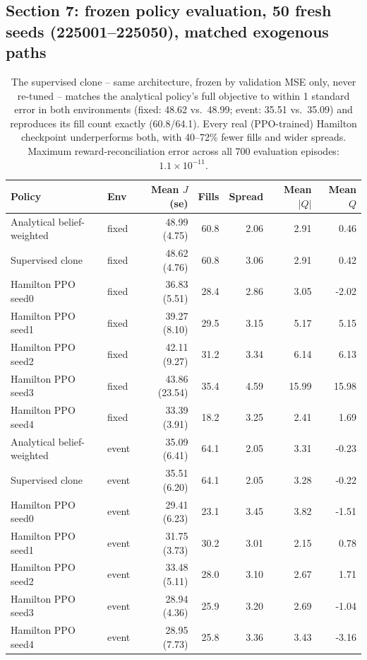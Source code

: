 \subsection*{Section 7: frozen policy evaluation, 50 fresh seeds (225001--225050), matched exogenous paths}
\begin{table}[h]
\centering
\small
\begin{tabular}{llrrrrr}
\hline
Policy & Env & Mean $J$ (se) & Fills & Spread & Mean $|Q|$ & Mean $Q$ \\
\hline
Analytical belief-weighted & fixed & 48.99 (4.75) & 60.8 & 2.06 & 2.91 &  0.46 \\
Supervised clone           & fixed & 48.62 (4.76) & 60.8 & 3.06 & 2.91 &  0.42 \\
Hamilton PPO seed0         & fixed & 36.83 (5.51) & 28.4 & 2.86 & 3.05 & -2.02 \\
Hamilton PPO seed1         & fixed & 39.27 (8.10) & 29.5 & 3.15 & 5.17 &  5.15 \\
Hamilton PPO seed2         & fixed & 42.11 (9.27) & 31.2 & 3.34 & 6.14 &  6.13 \\
Hamilton PPO seed3         & fixed & 43.86 (23.54)& 35.4 & 4.59 &15.99 & 15.98 \\
Hamilton PPO seed4         & fixed & 33.39 (3.91) & 18.2 & 3.25 & 2.41 &  1.69 \\
\hline
Analytical belief-weighted & event & 35.09 (6.41) & 64.1 & 2.05 & 3.31 & -0.23 \\
Supervised clone           & event & 35.51 (6.20) & 64.1 & 2.05 & 3.28 & -0.22 \\
Hamilton PPO seed0         & event & 29.41 (6.23) & 23.1 & 3.45 & 3.82 & -1.51 \\
Hamilton PPO seed1         & event & 31.75 (3.73) & 30.2 & 3.01 & 2.15 &  0.78 \\
Hamilton PPO seed2         & event & 33.48 (5.11) & 28.0 & 3.10 & 2.67 &  1.71 \\
Hamilton PPO seed3         & event & 28.94 (4.36) & 25.9 & 3.20 & 2.69 & -1.04 \\
Hamilton PPO seed4         & event & 28.95 (7.73) & 25.8 & 3.36 & 3.43 & -3.16 \\
\hline
\end{tabular}
\caption{The supervised clone -- same architecture, frozen by validation MSE only, never re-tuned --
matches the analytical policy's full objective to within 1 standard error in both environments
(fixed: 48.62 vs.\ 48.99; event: 35.51 vs.\ 35.09) and reproduces its fill count exactly (60.8/64.1).
Every real (PPO-trained) Hamilton checkpoint underperforms both, with 40--72\% fewer fills and
wider spreads. Maximum reward-reconciliation error across all 700 evaluation episodes: $1.1\times10^{-11}$.}
\end{table}

